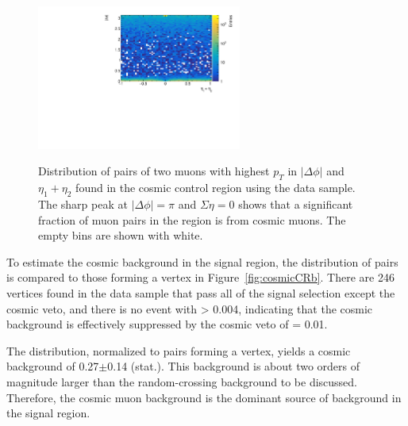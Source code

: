 \begin{figure}[!htb]
    \begin{center}
    \includegraphics[width=0.6\textwidth]{figures/Cosmics/DataValidation/mup_seta_dphi.pdf}
    \label{fig:cosmicData}
    \caption{Distribution of pairs of two muons with highest $p_{T}$ in $|\Delta \phi|$ and $\eta_{1}+\eta_{2}$ found in the cosmic control region using the data sample. The sharp peak at $|\Delta\phi| = \pi$ and $\Sigma \eta = 0$ shows that a significant fraction of muon pairs in the region is from cosmic muons. The empty bins are shown with white.}
\end{center}
\end{figure}

To estimate the cosmic background in the signal region, the \Rcr distribution of \mumu pairs is compared to those forming a vertex in Figure~\ref{fig:cosmicCRb}. There are 246 \mumu vertices found in the data sample that pass all of the signal selection except the cosmic veto, and there is no event with \Rcr > 0.004, indicating that the cosmic background is effectively suppressed by the cosmic veto of \Rcr = 0.01.

The \Rcr distribution, normalized to \mumu pairs forming a vertex, yields a cosmic background of 0.27$\pm$0.14 (stat.). This background is about two orders of magnitude larger than the random-crossing background to be discussed. Therefore, the cosmic muon background is the dominant source of background in the signal region.


